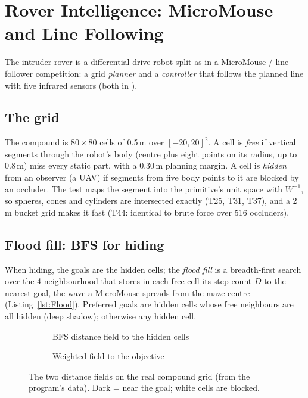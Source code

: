 \section{Rover Intelligence: MicroMouse and Line Following}\label{sec:rover}
The intruder rover is a differential-drive robot split as in a MicroMouse / line-follower competition: a grid \emph{planner} and a \emph{controller} that follows the planned line with five infrared sensors (both in ).

\subsection{The grid}
The compound is $80\times80$ cells of 0.5\,m over $[-20,20]^2$. A cell is \emph{free} if vertical segments through the robot's body (centre plus eight points on its radius, up to 0.8\,m) miss every static part, with a 0.30\,m planning margin. A cell is \emph{hidden} from an observer (a UAV) if segments from five body points to it are blocked by an occluder. The test maps the segment into the primitive's unit space with $W^{-1}$, so spheres, cones and cylinders are intersected exactly (T25, T31, T37), and a 2\,m bucket grid makes it fast (T44: identical to brute force over 516 occluders).

\subsection{Flood fill: BFS for hiding}
When hiding, the goals are the hidden cells; the \emph{flood fill} is a breadth-first search over the 4-neighbourhood that stores in each free cell its step count $D$ to the nearest goal, the wave a MicroMouse spreads from the maze centre (Listing~\ref{lst:Flood}). Preferred goals are hidden cells whose free neighbours are all hidden (deep shadow); otherwise any hidden cell.
\lstFlood
\begin{figure}[h]
\centering
\begin{subfigure}{0.49\linewidth}\caption{BFS distance field to the hidden cells}\end{subfigure}
\begin{subfigure}{0.49\linewidth}\caption{Weighted field to the objective}\end{subfigure}
\caption{The two distance fields on the real compound grid (from the program's data). Dark = near the goal; white cells are blocked.}\label{fig:flood}
\end{figure}

